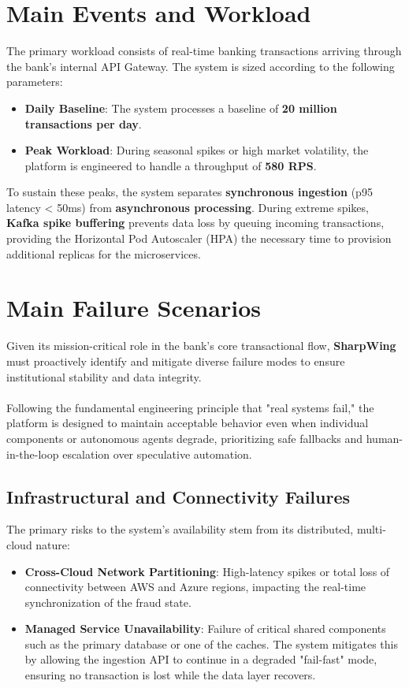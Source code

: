 \documentclass[12pt]{report}
\begin{document}
\section{Main Events and Workload}
The primary workload consists of real-time banking transactions arriving through the bank's internal API Gateway. The system is sized according to the following parameters:
\begin{itemize}
    \item \textbf{Daily Baseline}: The system processes a baseline of \textbf{20 million transactions per day}.
    \item \textbf{Peak Workload}: During seasonal spikes or high market volatility, the platform is engineered to handle a throughput of \textbf{580 RPS}.
\end{itemize}
To sustain these peaks, the system separates \textbf{synchronous ingestion} (p95 latency < 50ms) from \textbf{asynchronous processing}. During extreme spikes, \textbf{Kafka spike buffering} prevents data loss by queuing incoming transactions, providing the Horizontal Pod Autoscaler (HPA) the necessary time to provision additional replicas for the microservices.

\section{Main Failure Scenarios}
Given its mission-critical role in the bank's core transactional flow, \textbf{SharpWing} must proactively identify and mitigate diverse failure modes to ensure institutional stability and data integrity.\\\\
Following the fundamental engineering principle that "real systems fail," the platform is designed to maintain acceptable behavior even when individual components or autonomous agents degrade, prioritizing safe fallbacks and human-in-the-loop escalation over speculative automation.

\subsection{Infrastructural and Connectivity Failures}
The primary risks to the system's availability stem from its distributed, multi-cloud nature:
\begin{itemize}
    \item \textbf{Cross-Cloud Network Partitioning}: High-latency spikes or total loss of connectivity between AWS and Azure regions, impacting the real-time synchronization of the fraud state.
    \item \textbf{Managed Service Unavailability}: Failure of critical shared components such as the primary database or one of the caches. The system mitigates this by allowing the ingestion API to continue in a degraded "fail-fast" mode, ensuring no transaction is lost while the data layer recovers.
\end{itemize}
\end{document}

